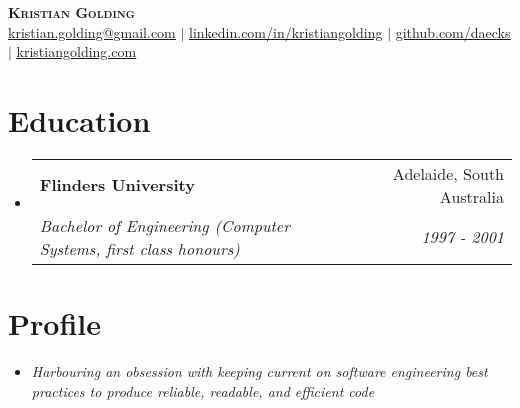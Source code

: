 \documentclass[letterpaper,11pt]{article}
\makeatletter
\newcommand{\resumeSubheading}[4]{
  \vspace{-2pt}\item
    \begin{tabular*}{0.97\textwidth}[t]{l@{\extracolsep{\fill}}r}
      \textbf{#1} & #2 \\
      \textit{\small#3} & \textit{\small #4} \\
    \end{tabular*}\vspace{-7pt}
}
\newcommand{\resumeSubtext}[1]{
  \item{
    {\textit{#1} \vspace{-2pt}}
  }
}
\newcommand{\resumeSubHeadingListStart}{\begin{itemize}[leftmargin=0.15in, label={}]}
\newcommand{\resumeSubHeadingListEnd}{\end{itemize}}
\makeatother
\begin{document}
\begin{center}
    \textbf{\Huge \scshape Kristian Golding} \\ \vspace{1pt} \href{mailto:krstian.golding@gmail.com}{\underline{kristian.golding@gmail.com}} $|$ 
    \href{https://linkedin.com/in/kristiangolding}{\underline{linkedin.com/in/kristiangolding}} $|$
    \href{https://github.com/daecks}{\underline{github.com/daecks}} $|$
    \href{https://kristiangolding.com}{\underline{kristiangolding.com}}
\end{center}


\section{Education}
  \resumeSubHeadingListStart
    \resumeSubheading
      {Flinders University}{Adelaide, South Australia}
      {Bachelor of Engineering (Computer Systems, first class honours)}{1997 - 2001}
  \resumeSubHeadingListEnd

\section{Profile}
  \resumeSubHeadingListStart
   \resumeSubtext{Harbouring an obsession with keeping current on software engineering best practices to produce reliable, readable, and efficient code}
  \resumeSubHeadingListEnd

\end{document}
